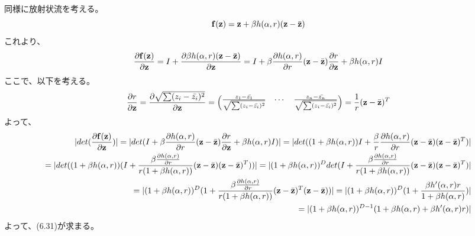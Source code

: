 ﻿\documentclass{jsarticle}
\begin{document}
同様に放射状流を考える。
\begin{equation}
{\bf f}({\bf z}) = {\bf z} + \beta h(\alpha, r)({\bf z} -\bar{{\bf z}})
\end{equation}
これより、
\begin{equation}
\begin{split}
\frac{\partial {\bf f}({\bf z})}{\partial {\bf z}} = I + \frac{\partial \beta h(\alpha, r)({\bf z} -\bar{{\bf z}})}{\partial {\bf z}}
= I + \beta \frac{\partial h(\alpha, r)}{\partial r}({\bf z} -\bar{{\bf z}})\frac{\partial r}{\partial {\bf z}}
+ \beta h(\alpha, r)I
\end{split}
\end{equation}
ここで、以下を考える。
\begin{equation}
\frac{\partial r}{\partial {\bf z}} = \frac{\partial \sqrt{\sum ({z_i} - \bar{z_i})^2}}{\partial {\bf z}}=
\begin{pmatrix}
\frac{z_1 - \bar{z_1}}{\sqrt{\sum ({z_i} - \bar{z_i})^2}} & \cdots & \frac{z_n - \bar{z_n}}{\sqrt{\sum ({z_i} - \bar{z_i})^2}}
\end{pmatrix}
= \frac{1}{r}({\bf z}-\bar{\bf z})^T
\end{equation}
よって、
\begin{equation}
\begin{split}
|det(\frac{\partial {\bf f}({\bf z})}{\partial {\bf z}})|
= |det(I + \beta \frac{\partial h(\alpha, r)}{\partial r}({\bf z} -\bar{{\bf z}})\frac{\partial r}{\partial {\bf z}}
+ \beta h(\alpha, r)I)|
= |det((1 + \beta h(\alpha, r))I + \frac{\beta}{r} \frac{\partial h(\alpha, r)}{\partial r}({\bf z} -\bar{{\bf z}})({\bf z} -\bar{{\bf z}})^T)|\\
= |det ((1 + \beta h(\alpha, r))(I + \frac{\beta \frac{\partial h(\alpha, r)}{\partial r}}{r(1 + \beta h(\alpha, r))} ({\bf z} -\bar{{\bf z}})({\bf z} -\bar{{\bf z}})^T))|
= |(1 + \beta h(\alpha, r))^D det(I + \frac{\beta \frac{\partial h(\alpha, r)}{\partial r}}{r(1 + \beta h(\alpha, r))} ({\bf z} -\bar{{\bf z}})({\bf z} -\bar{{\bf z}})^T)|\\
= |(1 + \beta h(\alpha, r))^D (1 + \frac{\beta \frac{\partial h(\alpha, r)}{\partial r}}{r(1 + \beta h(\alpha, r))} ({\bf z} -\bar{{\bf z}})^T({\bf z} -\bar{{\bf z}}))|
= |(1 + \beta h(\alpha, r))^D (1 + \frac{\beta h'(\alpha, r)r}{1 + \beta h(\alpha, r)} )|\\
= |(1 + \beta h(\alpha, r))^{D-1} (1 + \beta h(\alpha, r) + \beta h'(\alpha, r)r)|
\end{split}
\end{equation}
よって、(6.31)が求まる。
\end{document}
